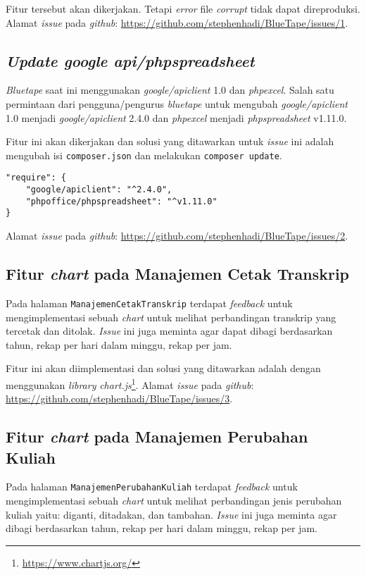 Fitur tersebut akan dikerjakan. Tetapi \textit{error} file \textit{corrupt} tidak dapat direproduksi. Alamat \textit{issue} pada \textit{github}: \url{https://github.com/stephenhadi/BlueTape/issues/1}. 

\subsection{\textit{Update google api/phpspreadsheet}}
\label{issue:2}
\textit{Bluetape} saat ini menggunakan \textit{google/apiclient} 1.0 dan \textit{phpexcel}. Salah satu permintaan dari pengguna/pengurus \textit{bluetape} untuk mengubah \textit{google/apiclient} 1.0 menjadi \textit{google/apiclient} 2.4.0 dan \textit{phpexcel} menjadi \textit{phpspreadsheet} v1.11.0. 

Fitur ini akan dikerjakan dan solusi yang ditawarkan untuk \textit{issue} ini adalah mengubah isi \texttt{composer.json} dan melakukan \texttt{composer update}.
\begin{lstlisting}
"require": {
	"google/apiclient": "^2.4.0",
	"phpoffice/phpspreadsheet": "^v1.11.0"
}
\end{lstlisting}

Alamat \textit{issue} pada \textit{github}: \url{https://github.com/stephenhadi/BlueTape/issues/2}. 
\subsection{Fitur \textit{chart} pada Manajemen Cetak Transkrip}
\label{issue:3}
Pada halaman \texttt{ManajemenCetakTranskrip} terdapat \textit{feedback} untuk mengimplementasi sebuah \textit{chart} untuk melihat perbandingan transkrip yang tercetak dan ditolak. \textit{Issue} ini juga meminta agar dapat dibagi berdasarkan tahun, rekap per hari dalam minggu, rekap per jam.

Fitur ini akan diimplementasi dan solusi yang ditawarkan adalah dengan menggunakan \textit{library} \textit{chart.js}\footnote{\label{ft:chartjs}\url{https://www.chartjs.org/}}. Alamat \textit{issue} pada \textit{github}: \url{https://github.com/stephenhadi/BlueTape/issues/3}.

\subsection{Fitur \textit{chart} pada Manajemen Perubahan Kuliah}
\label{issue:4}
Pada halaman \texttt{ManajemenPerubahanKuliah} terdapat \textit{feedback} untuk mengimplementasi sebuah \textit{chart} untuk melihat perbandingan jenis perubahan kuliah yaitu: diganti, ditadakan, dan tambahan. \textit{Issue} ini juga meminta agar dibagi berdasarkan tahun, rekap per hari dalam minggu, rekap per jam.

